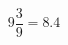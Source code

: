 \documentclass[preview]{standalone}
\begin{document}
\begin{align*}
9 \dfrac{ 3 }{ 9 }= 8.4
\end{align*}
\end{document}

